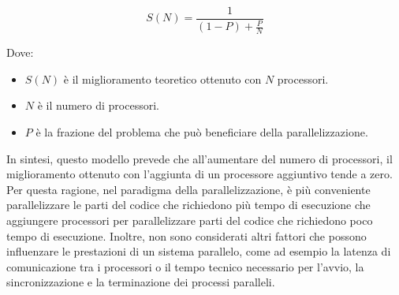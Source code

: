 \begin{equation}
  S(N) = \frac{1}{(1 - P) + \frac{P}{N}}
\end{equation}

Dove:
\begin{itemize}
  \item $S(N)$ è il miglioramento teoretico ottenuto con $N$ processori.

  \item $N$ è il numero di processori.

  \item $P$ è la frazione del problema che può beneficiare della parallelizzazione.
\end{itemize}

In sintesi, questo modello prevede che all'aumentare del numero di processori, il
miglioramento ottenuto con l'aggiunta di un processore aggiuntivo tende a zero.
Per questa ragione, nel paradigma della parallelizzazione, è più conveniente
parallelizzare le parti del codice che richiedono più tempo di esecuzione che
aggiungere processori per parallelizzare parti del codice che richiedono poco
tempo di esecuzione. Inoltre, non sono considerati altri fattori che possono
influenzare le prestazioni di un sistema parallelo, come ad esempio la latenza di
comunicazione tra i processori o il tempo tecnico necessario per l'avvio, la
sincronizzazione e la terminazione dei processi paralleli.